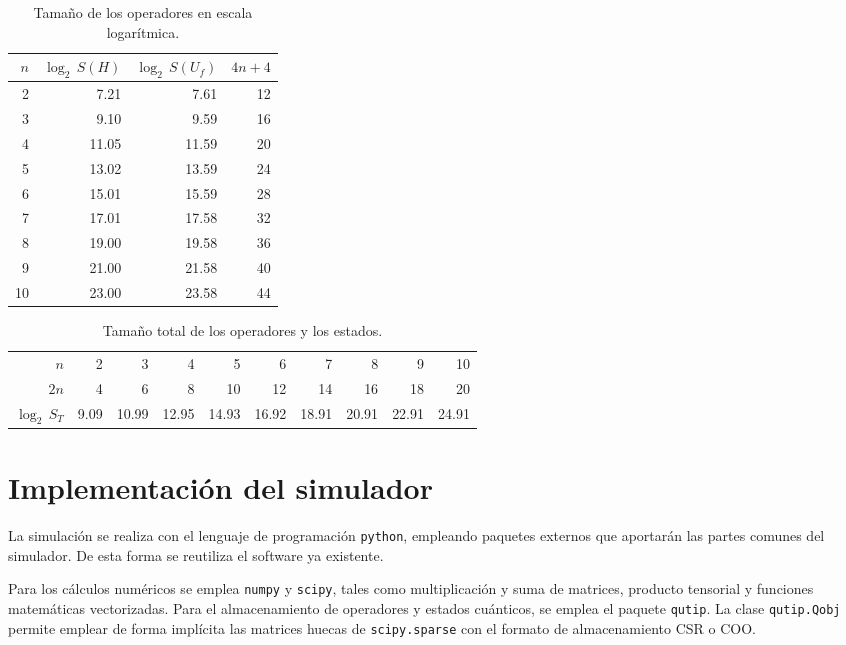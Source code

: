 \begin{ejemplo}
\begin{table}[h]
	\centering
	\begin{tabular}{*{4}{r}}
		\toprule
		$n$ & $\log_2 \, S(H)$ & $\log_2 \, S(U_f)$ & $4n+4$ \\
		\midrule
		2 	& 7.21	& 7.61	& 12\\
		3 	& 9.10	& 9.59	& 16\\
		4 	& 11.05	& 11.59	& 20\\
		5 	& 13.02	& 13.59	& 24\\
		6 	& 15.01	& 15.59	& 28\\
		7 	& 17.01	& 17.58	& 32\\
		8 	& 19.00	& 19.58	& 36\\
		9 	& 21.00	& 21.58	& 40\\
		10 	& 23.00	& 23.58	& 44\\
		\bottomrule
	\end{tabular}
	\caption{Tamaño de los operadores en escala logarítmica.}
\end{table}



\begin{table}[h]
	\centering
	\begin{tabular}{*{10}{r}}
		\toprule
$n$ & 2	& 3	& 4	& 5	& 6	& 7	& 8	& 9	& 10 \\
$2n$& 4	& 6	& 8	& 10	& 12	& 14	& 16	& 18	& 20 \\
$\log_2 \, S_T$ & 9.09	& 10.99	& 12.95	& 14.93	& 16.92	& 18.91	& 20.91	& 22.91	
& 24.91 \\
		\bottomrule
	\end{tabular}
	\caption{Tamaño total de los operadores y los estados.}
\end{table}


\end{ejemplo}

\section{Implementación del simulador}

La simulación se realiza con el lenguaje de programación \texttt{python}, 
empleando paquetes externos que aportarán las partes comunes del simulador. De 
esta forma se reutiliza el software ya existente.

Para los cálculos numéricos se emplea \texttt{numpy} y \texttt{scipy}, tales 
como multiplicación y suma de matrices, producto tensorial y funciones 
matemáticas vectorizadas. Para el almacenamiento de operadores y estados 
cuánticos, se emplea el paquete \texttt{qutip}. La clase \texttt{qutip.Qobj} 
permite emplear de forma implícita las matrices huecas de \texttt{scipy.sparse} 
con el formato de almacenamiento CSR o COO.

